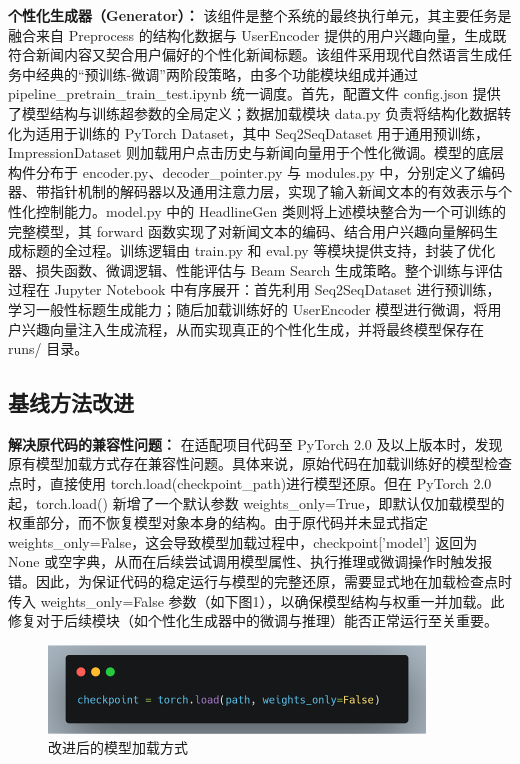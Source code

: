 \documentclass[10pt,a4paper]{article}
\begin{document}
\textbf{个性化生成器（Generator）：}
该组件是整个系统的最终执行单元，其主要任务是融合来自 Preprocess 的结构化数据与 UserEncoder 提供的用户兴趣向量，生成既符合新闻内容又契合用户偏好的个性化新闻标题。该组件采用现代自然语言生成任务中经典的“预训练-微调”两阶段策略，由多个功能模块组成并通过 pipeline\_pretrain\_train\_test.ipynb 统一调度。首先，配置文件 config.json 提供了模型结构与训练超参数的全局定义；数据加载模块 data.py 负责将结构化数据转化为适用于训练的 PyTorch Dataset，其中 Seq2SeqDataset 用于通用预训练，ImpressionDataset 则加载用户点击历史与新闻向量用于个性化微调。模型的底层构件分布于 encoder.py、decoder\_pointer.py 与 modules.py 中，分别定义了编码器、带指针机制的解码器以及通用注意力层，实现了输入新闻文本的有效表示与个性化控制能力。model.py 中的 HeadlineGen 类则将上述模块整合为一个可训练的完整模型，其 forward 函数实现了对新闻文本的编码、结合用户兴趣向量解码生成标题的全过程。训练逻辑由 train.py 和 eval.py 等模块提供支持，封装了优化器、损失函数、微调逻辑、性能评估与 Beam Search 生成策略。整个训练与评估过程在 Jupyter Notebook 中有序展开：首先利用 Seq2SeqDataset 进行预训练，学习一般性标题生成能力；随后加载训练好的 UserEncoder 模型进行微调，将用户兴趣向量注入生成流程，从而实现真正的个性化生成，并将最终模型保存在 runs/ 目录。

\subsection{基线方法改进}
\textbf{解决原代码的兼容性问题：}
在适配项目代码至 PyTorch 2.0 及以上版本时，发现原有模型加载方式存在兼容性问题。具体来说，原始代码在加载训练好的模型检查点时，直接使用 torch.load(checkpoint\_path)进行模型还原。但在 PyTorch 2.0 起，torch.load() 新增了一个默认参数 weights\_only=True，即默认仅加载模型的权重部分，而不恢复模型对象本身的结构。由于原代码并未显式指定 weights\_only=False，这会导致模型加载过程中，checkpoint['model'] 返回为 None 或空字典，从而在后续尝试调用模型属性、执行推理或微调操作时触发报错。因此，为保证代码的稳定运行与模型的完整还原，需要显式地在加载检查点时传入 weights\_only=False 参数（如下图1），以确保模型结构与权重一并加载。此修复对于后续模块（如个性化生成器中的微调与推理）能否正常运行至关重要。
\begin{figure}[H]
  \centering
  \includegraphics[width=10cm]{fig/load_new.png}
  \caption{改进后的模型加载方式}
\end{figure}
\end{document}
